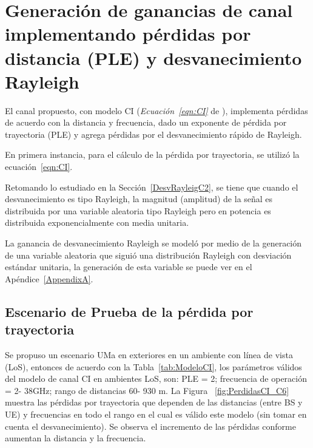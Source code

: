\break
\section{Generación de ganancias de canal implementando pérdidas por distancia (PLE) y desvanecimiento Rayleigh}

El canal propuesto, con modelo CI (\textit{Ecuación~\ref{eqn:CI}} de \parencite{Sun2016}), implementa pérdidas de acuerdo con la distancia y frecuencia, dado un exponente de pérdida por trayectoria (PLE) y agrega pérdidas por el desvanecimiento rápido de Rayleigh.\newline

En primera instancia, para el cálculo de la pérdida por trayectoria, se utilizó la ecuación~\ref{eqn:CI}.

Retomando lo estudiado en la Sección~\ref{DesvRayleigC2}, se tiene que cuando el desvanecimiento es tipo Rayleigh, la magnitud (amplitud) de la señal es distribuida por una variable aleatoria tipo Rayleigh pero en potencia es distribuida exponencialmente con media unitaria. \newline

La ganancia de desvanecimiento Rayleigh se modeló por medio de la generación de una variable aleatoria que siguió una distribución Rayleigh con desviación estándar unitaria, la generación de esta variable se puede ver en el Apéndice~\ref{AppendixA}.

\subsection{Escenario de Prueba de la pérdida por trayectoria}

Se propuso un escenario UMa en exteriores en un ambiente con línea de vista (LoS), entonces de acuerdo con la Tabla~\ref{tab:ModeloCI}, los parámetros válidos del modelo de canal CI en ambientes LoS, son: PLE = 2; frecuencia de operación = 2- 38GHz; rango de distancias 60- 930 m. La Figura ~\ref{fig:PerdidasCI_C6} muestra las pérdidas por trayectoria que dependen de las distancias (entre BS y UE) y frecuencias en todo el rango en el cual es válido este modelo (sin tomar en cuenta el desvanecimiento). Se observa el incremento de las pérdidas conforme aumentan la distancia y la frecuencia. \newline


